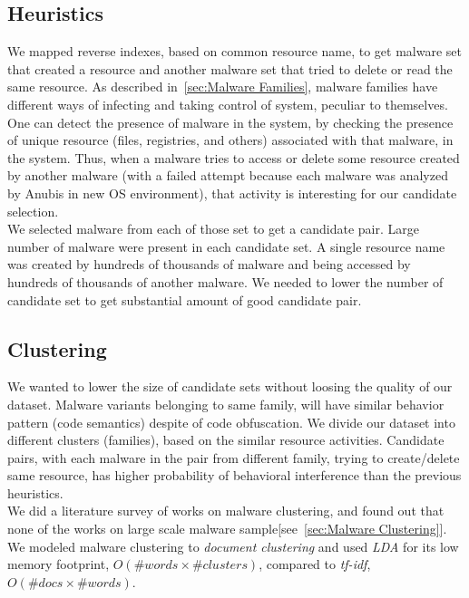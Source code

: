 \subsection{Heuristics}
\label{sub:Heuristics}
We mapped reverse indexes, based on common resource name, to get malware set that created a resource and another malware set that tried to delete or read the same resource.
As described in~\autoref{sec:Malware Families}, malware families have different ways of infecting and taking control of system, peculiar to themselves.
One can detect the presence of malware in the system, by checking the presence of unique resource (files, registries, and others) associated with that malware, in the system.
Thus, when a malware tries to access or delete some resource created by another malware (with a failed attempt because each malware was analyzed by Anubis in new OS environment), that activity is interesting for our candidate selection.\\
We selected malware from each of those set to get a candidate pair.
Large number of malware were present in each candidate set. A single resource name was created by hundreds of thousands of malware and being accessed by hundreds of thousands of another malware.
We needed to lower the number of candidate set to get substantial amount of good candidate pair.

\subsection{Clustering}
\label{sub:Clustering}
We wanted to lower the size of candidate sets without loosing the quality of our dataset.
Malware variants belonging to same family, will have similar behavior pattern (code semantics) despite of code obfuscation.
We divide our dataset into different clusters (families), based on the similar resource activities.
Candidate pairs, with each malware in the pair from different family, trying to create/delete same resource, has higher probability of behavioral interference than the previous heuristics.\\
We did a literature survey of works on malware clustering, and found out that none of the works on large scale malware sample[see~\autoref{sec:Malware Clustering}].
We modeled malware clustering to \emph{document clustering} and used \emph{LDA} for its low memory footprint, $O(\#words\times \#clusters)$, compared to \emph{tf-idf}, $O(\#docs \times \#words)$.
